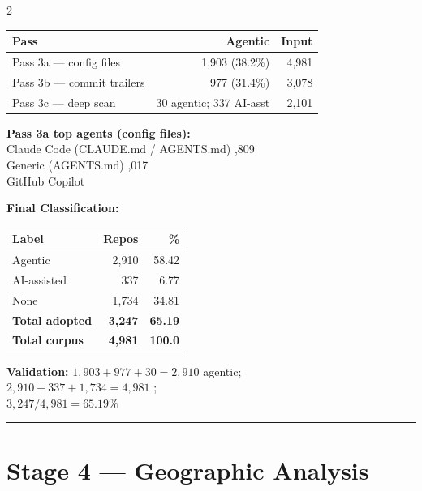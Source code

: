 \documentclass[10pt,a4paper]{article}
\begin{document}
\begin{multicols}{2}

\begin{tabular}{@{}lrr@{}}
\toprule
Pass & Agentic & Input \\
\midrule
Pass 3a --- config files    & 1,903 (38.2\%) & 4,981 \\
Pass 3b --- commit trailers &   977 (31.4\%) & 3,078 \\
Pass 3c --- deep scan       &    30 agentic; 337 AI-asst & 2,101 \\
\bottomrule
\end{tabular}

\textbf{Pass 3a top agents (config files):}\\
Claude Code (CLAUDE.md / AGENTS.md) ,809\\
Generic (AGENTS.md) ,017\\
GitHub Copilot 

\columnbreak

\textbf{Final Classification:}

\begin{tabular}{@{}lrr@{}}
\toprule
Label & Repos & \% \\
\midrule
Agentic      & 2,910 & 58.42 \\
AI-assisted  &   337 &  6.77 \\
None         & 1,734 & 34.81 \\
\midrule
\textbf{Total adopted} & \textbf{3,247} & \textbf{65.19} \\
\textbf{Total corpus}  & \textbf{4,981} & \textbf{100.0} \\
\bottomrule
\end{tabular}

\vspace{4pt}
\textbf{Validation:} $1{,}903 + 977 + 30 = 2{,}910$ agentic; \\
$2{,}910 + 337 + 1{,}734 = 4{,}981$ \checkmark; \\
$3{,}247 / 4{,}981 = 65.19\%$ \checkmark
\end{multicols}

\vspace{6pt}
\hrule
\vspace{6pt}

\newpage
\section*{Stage 4 --- Geographic Analysis}
\end{document}
